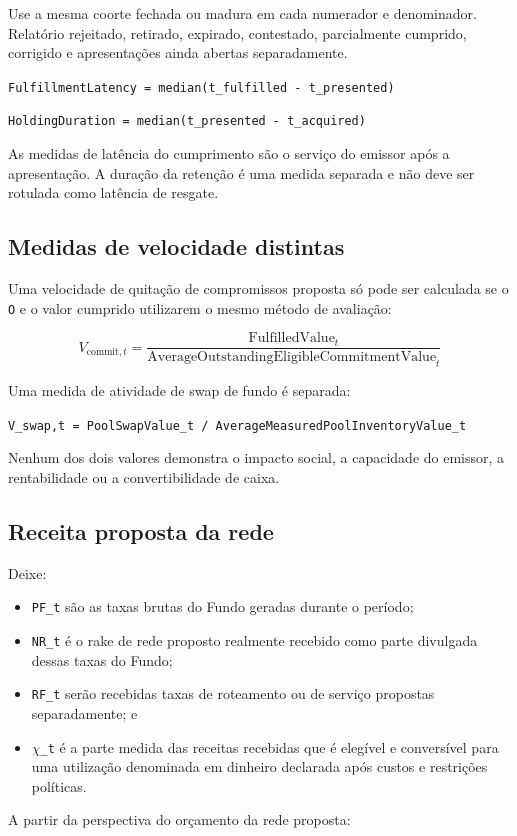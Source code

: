 \documentclass[11pt]{article}
\begin{document}
Use a mesma coorte fechada ou madura em cada numerador e denominador. Relatório rejeitado, retirado, expirado, contestado, parcialmente cumprido, corrigido e apresentações ainda abertas separadamente.

\texttt{FulfillmentLatency = median(t\_fulfilled - t\_presented)}

\texttt{HoldingDuration = median(t\_presented - t\_acquired)}

As medidas de latência do cumprimento são o serviço do emissor após a apresentação. A duração da retenção é uma medida separada e não deve ser rotulada como latência de resgate.

\subsection*{Medidas de velocidade distintas}

Uma velocidade de quitação de compromissos proposta só pode ser calculada se o \texttt{O} e o valor cumprido utilizarem o mesmo método de avaliação:

\[
V_{\mathrm{commit},t} = \frac{\mathrm{FulfilledValue}_t}{\mathrm{AverageOutstandingEligibleCommitmentValue}_t}
\]

Uma medida de atividade de swap de fundo é separada:

\texttt{V\_swap,t = PoolSwapValue\_t / AverageMeasuredPoolInventoryValue\_t}

Nenhum dos dois valores demonstra o impacto social, a capacidade do emissor, a rentabilidade ou a convertibilidade de caixa.

\subsection*{Receita proposta da rede}

Deixe:

\begin{itemize}[leftmargin=*]
\item \texttt{PF\_t} são as taxas brutas do Fundo geradas durante o período;
\item \texttt{NR\_t} é o rake de rede proposto realmente recebido como parte divulgada dessas taxas do Fundo;
\item \texttt{RF\_t} serão recebidas taxas de roteamento ou de serviço propostas separadamente; e
\item \texttt{$\chi$\_t} é a parte medida das receitas recebidas que é elegível e conversível para uma utilização denominada em dinheiro declarada após custos e restrições políticas.
\end{itemize}
A partir da perspectiva do orçamento da rede proposta:
\end{document}
